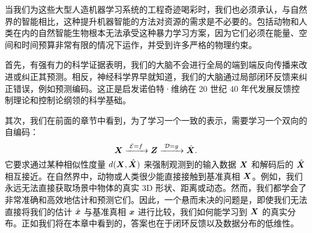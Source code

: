 \documentclass[../../book-main_zh.tex]{subfiles}
\begin{document}
当我们为这些大型人造机器学习系统的工程奇迹喝彩时，我们也必须承认，与自然界的智能相比，这种提升机器智能的方法对资源的需求是不必要的。包括动物和人类在内的自然智能生物根本无法承受这种暴力学习方案，因为它们必须在能量、空间和时间预算非常有限的情况下运作，并受到许多严格的物理约束。

首先，有强有力的科学证据表明，我们的大脑不会进行全局的端到端反向传播来改进或纠正其预测。相反，神经科学界早就知道，我们的大脑通过局部闭环反馈来纠正错误，例如预测编码。这正是启发诺伯特·维纳在 20 世纪 40 年代发展反馈控制理论和控制论纲领的科学基础。

其次，我们在前面的章节中看到，为了学习一个一致的表示，需要学习一个双向的自编码：
\begin{equation}
 \bm{X}
\xrightarrow{\hspace{1mm} \mathcal{E} = f \hspace{1mm}} \bm{Z}  \xrightarrow{\hspace{1mm} \mathcal{D} = g \hspace{1mm}} \hat{\bm{X}}.
\end{equation}
它要求通过某种相似性度量 $d(\bm{X}, \hat {\bm{X}})$ 来强制观测到的输入数据 $\bm{X}$ 和解码后的 $\hat {\bm{X}}$ 相互接近。在自然界中，动物或人类很少能直接接触到基准真相 $\bm{X}$。例如，我们永远无法直接获取场景中物体的真实 3D 形状、距离或动态。然而，我们都学会了非常准确和高效地估计和预测它们。因此，一个悬而未决的问题是，即使我们无法直接将我们的估计 $\hat {\bm{x}}$ 与基准真相 $\bm{x}$ 进行比较，我们如何能学习到 $\bm{X}$ 的真实分布。正如我们将在本章中看到的，答案也在于闭环反馈以及数据分布的低维性。




\end{document}
